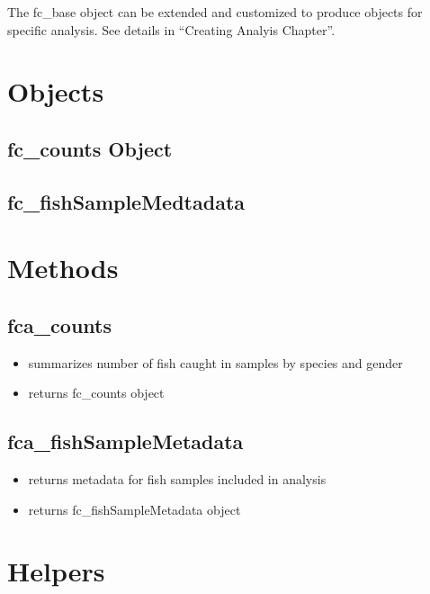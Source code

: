 \documentclass[
  letterpaper,
  DIV=11,
  numbers=noendperiod]{scrreprt}
\providecommand{\tightlist}{%
  \setlength{\itemsep}{0pt}\setlength{\parskip}{0pt}}\usepackage{longtable,booktabs,array}
\begin{document}
The fc\_base object can be extended and customized to produce objects
for specific analysis. See details in ``Creating Analyis Chapter''.

\chapter{Objects}\label{objects}

\section{fc\_counts Object}\label{fc_counts-object}

\section{fc\_fishSampleMedtadata}\label{fc_fishsamplemedtadata}

\chapter{Methods}\label{methods-1}

\section{fca\_counts}\label{fca_counts}

\begin{itemize}
\tightlist
\item
  summarizes number of fish caught in samples by species and gender
\item
  returns fc\_counts object
\end{itemize}

\section{fca\_fishSampleMetadata}\label{fca_fishsamplemetadata}

\begin{itemize}
\tightlist
\item
  returns metadata for fish samples included in analysis
\item
  returns fc\_fishSampleMetadata object
\end{itemize}

\chapter{Helpers}\label{helpers}
\end{document}
